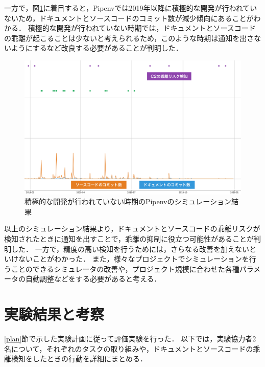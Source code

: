 一方で，図\ref{simpipenv}に着目すると，Pipenvでは2019年以降に積極的な開発が行われていないため，ドキュメントとソースコードのコミット数が減少傾向にあることがわかる．
積極的な開発が行われていない時期では，ドキュメントとソースコードの乖離が起こることは少ないと考えられるため，このような時期は通知を出さないようにするなど改良する必要があることが判明した．
\begin{figure}[H]
    \centering
    \includegraphics[width=12cm]{images/pipenv.png}
    \caption{積極的な開発が行われていない時期のPipenvのシミュレーション結果}
    \label{simpipenv}
\end{figure}

以上のシミュレーション結果より，ドキュメントとソースコードの乖離リスクが検知されたときに通知を出すことで，乖離の抑制に役立つ可能性があることが判明した．
一方で，精度の高い検知を行うためには，さらなる改善を加えないといけないことがわかった．
また，様々なプロジェクトでシミュレーションを行うことのできるシミュレータの改善や，プロジェクト規模に合わせた各種パラメータの自動調整などをする必要があると考える．


\section{実験結果と考察}
\ref{plan}節で示した実験計画に従って評価実験を行った．
以下では，実験協力者2名について，それぞれのタスクの取り組みや，ドキュメントとソースコードの乖離検知をしたときの行動を詳細にまとめる．

